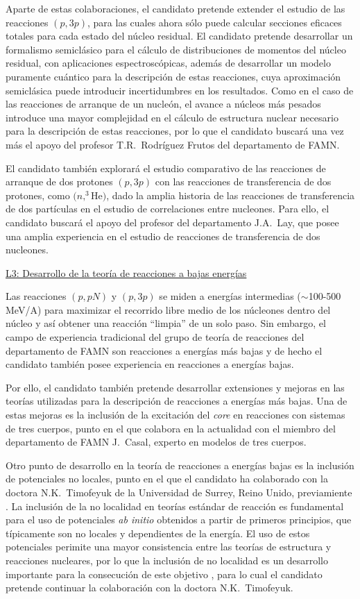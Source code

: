 \documentclass[a4paper,12pt,twoside]{article}
\begin{document}
Aparte de estas colaboraciones, el candidato pretende extender el estudio de las reacciones $(p,3p)$, para las cuales ahora sólo puede calcular secciones eficaces totales para cada estado del núcleo residual. El candidato pretende desarrollar un formalismo semiclásico para el cálculo de distribuciones de momentos del núcleo residual, con aplicaciones espectroscópicas, además de desarrollar un modelo puramente cuántico para la descripción de estas reacciones, cuya aproximación semiclásica puede introducir incertidumbres en los resultados. Como en el caso de las reacciones de arranque de un nucleón, el avance a núcleos más pesados introduce una mayor complejidad en el cálculo de estructura nuclear necesario para la descripción de estas reacciones, por lo que el candidato buscará una vez más el apoyo del profesor T.R.~Rodríguez Frutos del departamento de FAMN.

El candidato también explorará el estudio comparativo de las reacciones de arranque de dos protones $(p,3p)$ con las reacciones de transferencia de dos protones, como $(n,^3$He$)$, dado la amplia historia de las reacciones de transferencia de dos partículas en el estudio de correlaciones entre nucleones. Para ello, el candidato buscará el apoyo del profesor del departamento J.A.~Lay, que posee una amplia experiencia en el estudio de reacciones de transferencia de dos nucleones.

\underline{L3: Desarrollo de la teoría de reacciones a bajas energías}

Las reacciones $(p,pN)$ y $(p,3p)$ se miden a energías intermedias ($\sim$100-500 MeV/A) para maximizar el recorrido libre medio de los núcleones dentro del núcleo y así obtener una reacción ``limpia'' de un solo paso. Sin embargo, el campo de experiencia tradicional del grupo de teoría de reacciones del departamento de FAMN  son reacciones a energías más bajas y de hecho el candidato también posee experiencia en reacciones a energías bajas.

Por ello, el candidato también pretende desarrollar extensiones y mejoras en las teorías utilizadas para la descripción de reacciones a energías más bajas. Una de estas mejoras es la inclusión de la excitación del \textit{core} en reacciones con sistemas de tres cuerpos, punto en el que colabora en la actualidad con el miembro del departamento de FAMN J.~Casal, experto en modelos de tres cuerpos.

Otro punto de desarrollo en la teoría de reacciones a energías bajas es la inclusión de potenciales no locales, punto en el que el candidato ha colaborado con la doctora N.K.~Timofeyuk de la Universidad de Surrey, Reino Unido, previamiente \cite{Tim18,Tim19,Fro23}. La inclusión de la no localidad en teorías estándar de reacción es fundamental para el uso de potenciales \textit{ab initio} obtenidos a partir de primeros principios, que típicamente son no locales y dependientes de la energía. El uso de estos potenciales perimite una mayor consistencia entre las teorías de estructura y reacciones nucleares, por lo que la inclusión de no localidad es un desarrollo importante para la consecución de este objetivo \cite{nupecc}, para lo cual el candidato pretende continuar la colaboración con la doctora N.K.~Timofeyuk.
\end{document}
